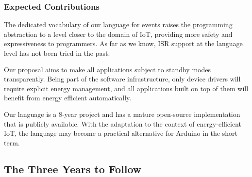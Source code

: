 \documentclass[12pt,english]{amsart}
\begin{document}
\subsubsection{\textbf{Expected Contributions}}


    The dedicated vocabulary of our language for events raises the
    programming abstraction to a level closer to the domain of IoT, providing
    more safety and expressiveness to programmers.
    As far as we know, ISR support at the language level has not been
    tried in the past.

    Our proposal aims to make all applications subject to standby modes
    transparently.
    Being part of the software infrastructure, only device drivers will require
    explicit energy management, and all applications built on top of them will
    benefit from energy efficient automatically.

    Our language is a 8-year project and has a mature open-source
    implementation that is publicly available.
    With the adaptation to the context of energy-efficient IoT, the language
    may become a practical alternative for Arduino in the short term.


\subsection{The Three Years to Follow}
\end{document}
